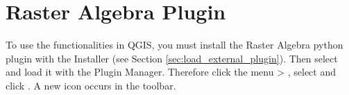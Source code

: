 
\section{Raster Algebra Plugin}\label{sec:ftools}



To use the functionalities in QGIS, you must install the Raster Algebra 
python plugin with the  Installer 
(see Section \ref{sec:load_external_plugin}). Then select and load it 
with the Plugin Manager. Therefore click the menu  > 
, select  and click 
. A new  icon occurs 
in the toolbar.
